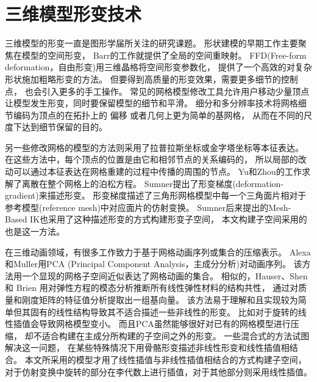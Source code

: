 \section{三维模型形变技术}
三维模型的形变一直是图形学届所关注的研究课题。
形状建模的早期工作主要聚焦在模型的空间形变，
Barr的工作\cite{barr1984global}就提供了全局的空间重映射。
FFD(Free-form deformation，自由形变)\cite{sederberg1986free}用三维晶格将空间形变参数化，
提供了一个高效的对复杂形状施加粗略形变的方法。
但要得到高质量的形变效果，需要更多细节的控制点\cite{coquillart1990extended}，
也会引入更多的手工操作。
常见的网格模型修改工具允许用户移动少量顶点让模型发生形变，同时要保留模型的细节和平滑。
细分和多分辨率技术将网格细节编码为顶点的在拓扑上的
偏移\cite{zorin1997interactive}\cite{kobbelt2000multiresolution}
或者几何上更为简单的基网格\cite{kobbelt1998interactive}，
从而在不同的尺度下达到细节保留的目的。

另一些修改网格的模型的方法则采用了拉普拉斯坐标或金字塔坐标等本征表达。
在这些方法中，每个顶点的位置是由它和相邻节点的关系编码的，
所以局部的改动可以通过本征表达在网格重建的过程中传播的周围的节点。
Yu和Zhou的工作\cite{yu2004mesh}求解了离散在整个网格上的泊松方程。
Sumner提出了形变梯度(deformation-gradient)\cite{sumner2004deformation}来描述形变。
形变梯度描述了三角形网格模型中每一个三角面片相对于参考模型(reference mesh)中对应面片的仿射变换。
Sumner后来提出的Mesh-Based IK\cite{sumner2005mesh}也采用了这种描述形变的方式构建形变子空间，
本文构建子空间采用的也是这一方法。

在三维动画领域，有很多工作致力于基于网格动画序列或集合的压缩表示。
Alexa和Muller\cite{alexa2000representing}用PCA
(Principal Component Analysis，主成分分析)对动画序列。
该方法用一个显现的网格子空间近似表达了网格动画的集合。
相似的，Hauser、Shen和 Brien\cite{hauser2003interactive}
用对弹性方程的模态分析推断所有线性弹性材料的结构共性，
通过对质量和刚度矩阵的特征值分析提取出一组基向量。
该方法易于理解和且实现较为简单但其固有的线性结构导致其不适合描述一些非线性的形变。
比如对于旋转的线性插值会导致网格模型变小。
而且PCA虽然能够很好对已有的网格模型进行压缩，
却不适合构建在主成分所构建的子空间之外的形变。
一些混合式的方法试图解决这一问题，
在某些特殊情况下用骨骼形变描述非线性形变和线性插值相结合\cite{lewis2000pose}。
本文所采用的模型才用了线性插值与非线性插值相结合的方式构建子空间，
对于仿射变换中旋转的部分在李代数上进行插值，对于其他部分则采用线性插值。

